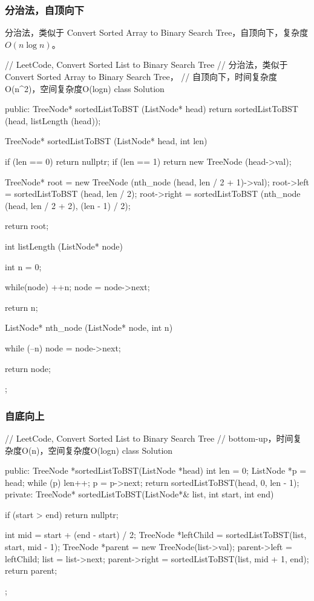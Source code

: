 \subsubsection{分治法，自顶向下}
分治法，类似于 Convert Sorted Array to Binary Search Tree，自顶向下，复杂度$O(n\log n)$。
\begin{Code}
// LeetCode, Convert Sorted List to Binary Search Tree
// 分治法，类似于 Convert Sorted Array to Binary Search Tree，
// 自顶向下，时间复杂度O(n^2)，空间复杂度O(logn)
class Solution {
public:
    TreeNode* sortedListToBST (ListNode* head) {
        return sortedListToBST (head, listLength (head));
    }

    TreeNode* sortedListToBST (ListNode* head, int len) {
        if (len == 0) return nullptr;
        if (len == 1) return new TreeNode (head->val);

        TreeNode* root = new TreeNode (nth_node (head, len / 2 + 1)->val);
        root->left = sortedListToBST (head, len / 2);
        root->right = sortedListToBST (nth_node (head, len / 2 + 2), 
                (len - 1) / 2);

        return root;
    }

    int listLength (ListNode* node) {
        int n = 0;

        while(node) {
            ++n;
            node = node->next;
        }

        return n;
    }

    ListNode* nth_node (ListNode* node, int n) {
        while (--n)
            node = node->next;

        return node;
    }
};
\end{Code}


\subsubsection{自底向上}
\begin{Code}
// LeetCode, Convert Sorted List to Binary Search Tree
// bottom-up，时间复杂度O(n)，空间复杂度O(logn)
class Solution {
public:
    TreeNode *sortedListToBST(ListNode *head) {
        int len = 0;
        ListNode *p = head;
        while (p) {
            len++;
            p = p->next;
        }
        return sortedListToBST(head, 0, len - 1);
    }
private:
    TreeNode* sortedListToBST(ListNode*& list, int start, int end) {
        if (start > end) return nullptr;

        int mid = start + (end - start) / 2;
        TreeNode *leftChild = sortedListToBST(list, start, mid - 1);
        TreeNode *parent = new TreeNode(list->val);
        parent->left = leftChild;
        list = list->next;
        parent->right = sortedListToBST(list, mid + 1, end);
        return parent;
    }
};
\end{Code}


